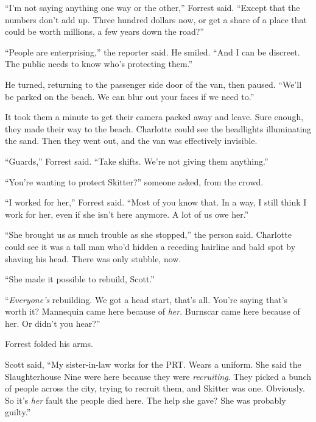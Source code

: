 ``I'm not saying anything one way or the other,'' Forrest said.  ``Except that the numbers don't add up.  Three hundred dollars now, or get a share of a place that could be worth millions, a few years down the road?''



``People are enterprising,'' the reporter said.  He smiled.  ``And I can be discreet.  The public needs to know who's protecting them.''



He turned, returning to the passenger side door of the van, then paused.  ``We'll be parked on the beach.  We can blur out your faces if we need to.''



It took them a minute to get their camera packed away and leave.  Sure enough, they made their way to the beach.  Charlotte could see the headlights illuminating the sand.  Then they went out, and the van was effectively invisible.



``Guards,'' Forrest said.  ``Take shifts.  We're not giving them anything.''



``You're wanting to protect Skitter?'' someone asked, from the crowd.



``I worked for her,'' Forrest said.  ``Most of you know that.  In a way, I still think I work for her, even if she isn't here anymore.  A lot of us owe her.''



``She brought us as much trouble as she stopped,'' the person said.  Charlotte could see it was a tall man who'd hidden a receding hairline and bald spot by shaving his head.  There was only stubble, now.



``She made it possible to rebuild, Scott.''



``\emph{Everyone's }rebuilding.  We got a head start, that's all.  You're saying that's worth it?  Mannequin came here because of \emph{her}.  Burnscar came here because of her.  Or didn't you hear?''



Forrest folded his arms.



Scott said, ``My sister-in-law works for the PRT.  Wears a uniform.  She said the Slaughterhouse Nine were here because they were \emph{recruiting}.  They picked a bunch of people across the city, trying to recruit them, and Skitter was one.  Obviously.  So it's \emph{her} fault the people died here.  The help she gave?  She was probably guilty.''



